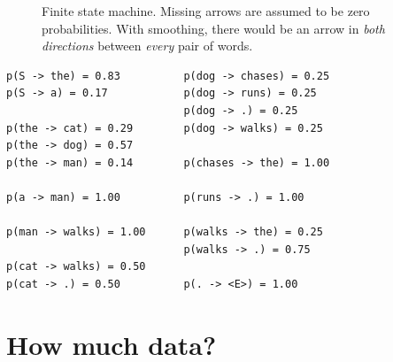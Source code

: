 \documentclass[11pt,letterpaper]{article}
\begin{document}
\begin{figure}
\caption{Finite state machine.  Missing arrows are assumed to be zero probabilities.  With smoothing, there would be an arrow in \textit{both directions} between \textit{every} pair of words.}
\end{figure} 

\begin{verbatim}
p(S -> the) = 0.83          p(dog -> chases) = 0.25
p(S -> a) = 0.17            p(dog -> runs) = 0.25
                            p(dog -> .) = 0.25
p(the -> cat) = 0.29        p(dog -> walks) = 0.25
p(the -> dog) = 0.57
p(the -> man) = 0.14        p(chases -> the) = 1.00

p(a -> man) = 1.00          p(runs -> .) = 1.00

p(man -> walks) = 1.00      p(walks -> the) = 0.25
                            p(walks -> .) = 0.75
p(cat -> walks) = 0.50
p(cat -> .) = 0.50          p(. -> <E>) = 1.00
\end{verbatim}


\section{How much data?}
\end{document}
